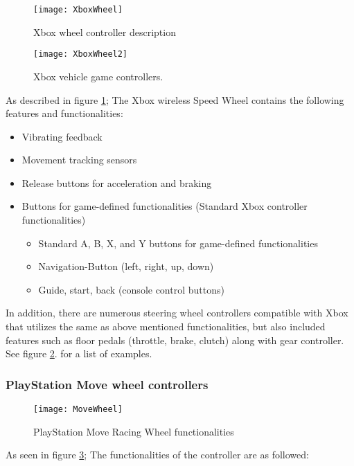 \begin{figure}[p]
\centering
\caption{Xbox wheel controller description \parencite{Xbox2013}}
\label{fig:XboxWheel}
\texttt{[image: XboxWheel]} 
\end{figure}
\begin{figure}[p]
\centering
\texttt{[image: XboxWheel2]}
\caption{Xbox vehicle game controllers. \parencite{Xbox2013}}
\label{fig:XboxWheel2}
\end{figure}

As described in figure \ref{fig:XboxWheel}; The Xbox wireless Speed Wheel contains the following features and functionalities:

\begin{itemize}
\item Vibrating feedback
\item Movement tracking sensors
\item Release buttons for acceleration and braking
\item Buttons for game-defined functionalities (Standard Xbox controller functionalities)
	\begin{itemize}
		\item Standard A, B, X, and Y buttons for game-defined functionalities
		\item Navigation-Button (left, right, up, down)
		\item Guide, start, back (console control buttons)
	\end{itemize}
\end{itemize}

In addition, there are numerous steering wheel controllers compatible with Xbox that utilizes the same as above mentioned functionalities, but also included features such as floor pedals (throttle, brake, clutch) along with gear controller. See figure \ref{fig:XboxWheel2}. for a list of examples.
\bigskip

\pagebreak[4]

\subsubsection*{PlayStation Move wheel controllers}
\parencite{Move2013}

\begin{figure}[!htbp]
\centering
\texttt{[image: MoveWheel]}
\caption{PlayStation Move Racing Wheel functionalities \parencite{Move2013}}
\label{fig:MoveWheel}
\end{figure}

As seen in figure \ref{fig:MoveWheel}; The functionalities of the controller are as followed:

